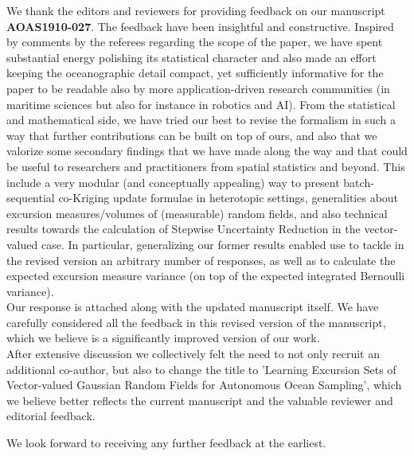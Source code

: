 \documentclass[10pt,stdletter]{newlfm}
\begin{document}
\begin{newlfm}

We thank the editors and reviewers for providing feedback on our manuscript \textbf{AOAS1910-027}. The feedback have been insightful and constructive. Inspired by comments by the referees regarding the scope of the paper, we have spent substantial energy polishing its statistical character and also made an effort keeping the oceanographic detail compact, yet sufficiently informative for the paper to be readable also by more application-driven research communities (in maritime sciences but also for instance in robotics and AI). From the statistical and mathematical side, we have tried our best to revise the formalism in such a way that further contributions can be built on top of ours, and also that we valorize some secondary findings that we have made along the way and that could be useful to researchers and practitioners from spatial statistics and beyond. This include a very modular (and conceptually appealing) way to present batch-sequential co-Kriging update formulae in heterotopic settings, generalities about excursion measures/volumes of (measurable) random fields, and also technical results towards the calculation of Stepwise Uncertainty Reduction in the vector-valued case. In particular, generalizing our former results enabled use to tackle in the revised version an arbitrary number of responses, as well as to calculate the expected excursion measure variance (on top of the expected integrated Bernoulli variance).\\ 

Our response is attached along with the updated manuscript itself. We have carefully considered all the feedback in this revised version of the manuscript, which we believe is a significantly improved version of our work.\\ 

After extensive discussion we collectively felt the need to not only recruit an additional co-author, but also to change the title to 'Learning Excursion Sets of Vector-valued Gaussian Random Fields for Autonomous Ocean Sampling', which we believe better reflects the current manuscript and the valuable reviewer and editorial feedback. 



We look forward to receiving any further feedback at the earliest.
\vspace{1em}


\end{newlfm}
\end{document}
